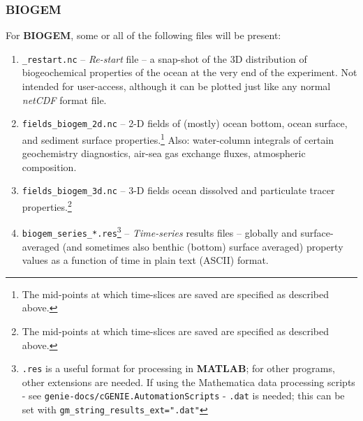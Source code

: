 \documentclass[11pt,fleqn]{book} %
\begin{document}
\subsubsection{BIOGEM}

\noindent For \textbf{BIOGEM}, some or all of the following files will be present:

\begin{enumerate}

\vspace{1mm}\item \texttt{\_restart.nc} -- \textit{Re-start} file -- a snap-shot of the 3D distribution of biogeochemical properties of the ocean at the very end of the experiment. Not intended for user-access, although it can be plotted just like any normal \textit{netCDF} format file.

\vspace{1mm}\item \texttt{fields\_biogem\_2d.nc} -- 2-D fields of (mostly) ocean bottom, ocean surface, and sediment surface properties.\footnote{The mid-points at which time-slices are saved are specified as described above.} Also: water-column integrals of certain geochemistry diagnostics, air-sea gas exchange fluxes, atmospheric composition.

\vspace{1mm}\item \texttt{fields\_biogem\_3d.nc} -- 3-D fields ocean dissolved and particulate tracer properties.\footnote{The mid-points at which time-slices are saved are specified as described above.}

\vspace{1mm}\item \texttt{biogem\_series\_*.res}\footnote{\texttt{.res} is a useful format for processing in \textbf{MATLAB}; for other programs, other extensions are needed. If using the Mathematica data processing scripts - see \texttt{genie-docs/cGENIE.AutomationScripts} - \texttt{.dat} is needed; this can be set with  \texttt{gm\_string\_results\_ext=".dat"}} -- \textit{Time-series} results files -- globally and surface-averaged (and sometimes also benthic (bottom) surface averaged) property values as a function of time in plain text (ASCII) format.


\end{enumerate}
\end{document}
